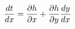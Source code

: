 \documentclass[preview]{standalone}
\begin{document}
\begin{align*}
\special{dvisvgm:raw <g id='unique000'>}\frac{dt}{dx} = \frac{\partial h}{\partial x} + \frac{\partial h}{\partial y}\frac{dy}{dx}\special{dvisvgm:raw </g>}
\end{align*}
\end{document}
